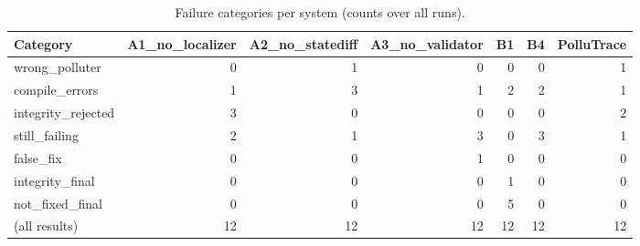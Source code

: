 \begin{table}[t]
\centering
\footnotesize
\caption{Failure categories per system (counts over all runs).}
\label{tab:fail}
\begin{tabular}{lrrrrrr}
\toprule
\textbf{Category} & \textbf{A1\_no\_localizer} & \textbf{A2\_no\_statediff} & \textbf{A3\_no\_validator} & \textbf{B1} & \textbf{B4} & \textbf{PolluTrace} \\
\midrule
wrong\_polluter & 0 & 1 & 0 & 0 & 0 & 1 \\
compile\_errors & 1 & 3 & 1 & 2 & 2 & 1 \\
integrity\_rejected & 3 & 0 & 0 & 0 & 0 & 2 \\
still\_failing & 2 & 1 & 3 & 0 & 3 & 1 \\
false\_fix & 0 & 0 & 1 & 0 & 0 & 0 \\
integrity\_final & 0 & 0 & 0 & 1 & 0 & 0 \\
not\_fixed\_final & 0 & 0 & 0 & 5 & 0 & 0 \\
(all results) & 12 & 12 & 12 & 12 & 12 & 12 \\
\bottomrule
\end{tabular}
\end{table}
